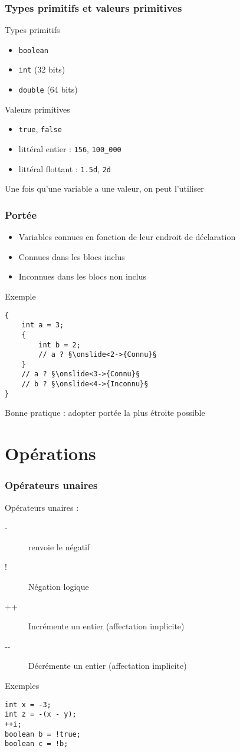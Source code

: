 \documentclass[english, french]{beamer}
\begin{document}
\begin{frame}
	\frametitle{Types primitifs et valeurs primitives}
	\begin{block}{Types primitifs}
		\begin{itemize}
			\item \texttt{boolean}
			\item \texttt{int} (32 bits)
			\item \texttt{double} (64 bits)
		\end{itemize}
	\end{block}
	\begin{block}{Valeurs primitives}
		\begin{itemize}
			\item \texttt{true}, \texttt{false}
			\item littéral entier : \texttt{156}, \texttt{100\_000}
			\item littéral flottant : \texttt{1.5d}, \texttt{2d} 
		\end{itemize}
	\end{block}
	Une fois qu’une variable a une valeur, on peut l’utiliser
\end{frame}

\begin{frame}[fragile]
	\frametitle{Portée}
	\begin{itemize}
		\item Variables connues en fonction de leur endroit de déclaration
		\item Connues dans les blocs inclus
		\item Inconnues dans les blocs non inclus
	\end{itemize}
	\begin{block}{Exemple}
		\begin{lstlisting}
{
	int a = 3;
	{
		int b = 2;
		// a ? §\onslide<2->{Connu}§
	}
	// a ? §\onslide<3->{Connu}§
	// b ? §\onslide<4->{Inconnu}§
}
		\end{lstlisting}	
	\end{block}
	Bonne pratique : adopter portée la plus étroite possible
\end{frame}

\section{Opérations}
\begin{frame}[fragile]
	\frametitle{Opérateurs unaires}
	Opérateurs unaires :
	\begin{description}
		\item[-] renvoie le négatif
		\item[!] Négation logique
		\item[++] Incrémente un entier (affectation implicite)
		\item[-{}-] Décrémente un entier (affectation implicite)
	\end{description}
	\begin{block}{Exemples}
		\begin{lstlisting}
int x = -3;
int z = -(x - y);
++i;
boolean b = !true;
boolean c = !b;
		\end{lstlisting}	
	\end{block}
\end{frame}
\end{document}
